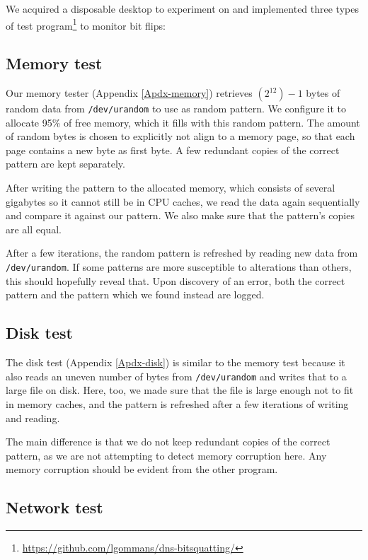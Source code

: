 \documentclass[conference]{IEEEtran}
\begin{document}
We acquired a disposable desktop to experiment on and implemented three types
of test program\footnote{\url{https://github.com/lgommans/dns-bitsquatting/}}
to monitor bit flips:

\subsection{Memory test}

Our memory tester (Appendix \ref{Apdx-memory}) retrieves $(2^{12})-1$ bytes of
random data from \texttt{/dev/urandom} to use as random pattern. We configure
it to allocate 95\% of free memory, which it fills with this random pattern.
The amount of random bytes is chosen to explicitly not align to a memory page,
so that each page contains a new byte as first byte. A few redundant copies of
the correct pattern are kept separately.

After writing the pattern to the allocated memory, which consists of several
gigabytes so it cannot still be in CPU caches, we read the data again
sequentially and compare it against our pattern. We also make sure that the
pattern's copies are all equal.

After a few iterations, the random pattern is refreshed by reading new data
from \texttt{/dev/urandom}. If some patterns are more susceptible to
alterations than others, this should hopefully reveal that. Upon discovery of
an error, both the correct pattern and the pattern which we found instead are
logged.

\subsection{Disk test}

The disk test (Appendix \ref{Apdx-disk}) is similar to the memory test because
it also reads an uneven number of bytes from \texttt{/dev/urandom} and writes
that to a large file on disk. Here, too, we made sure that the file is large
enough not to fit in memory caches, and the pattern is refreshed after a few
iterations of writing and reading.

The main difference is that we do not keep redundant copies of the correct
pattern, as we are not attempting to detect memory corruption here. Any memory
corruption should be evident from the other program.

\subsection{Network test}
\end{document}
